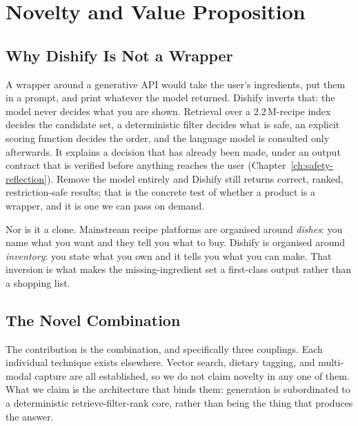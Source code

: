 \chapter{Novelty and Value Proposition}
\label{ch:novelty}

\section{Why Dishify Is Not a Wrapper}

A wrapper around a generative API would take the user's ingredients, put them
in a prompt, and print whatever the model returned. Dishify inverts that: the
model never decides what you are shown. Retrieval over a 2.2\,M-recipe index
decides the candidate set, a deterministic filter decides what is safe, an
explicit scoring function decides the order, and the language model is
consulted only afterwards. It explains a decision that has already been made,
under an output contract that is verified before anything reaches the user
(Chapter~\ref{ch:safety-reflection}). Remove the model entirely and Dishify
still returns correct, ranked, restriction-safe results; that is the concrete
test of whether a product is a wrapper, and it is one we can pass on demand.

Nor is it a clone. Mainstream recipe platforms are organised around
\emph{dishes}: you name what you want and they tell you what to buy. Dishify is
organised around \emph{inventory}: you state what you own and it tells you what
you can make. That inversion is what makes the missing-ingredient set a
first-class output rather than a shopping list.

\section{The Novel Combination}

The contribution is the combination, and specifically three couplings. Each
individual technique exists elsewhere. Vector search, dietary tagging, and
multi-modal capture are all established, so we do not claim novelty in any one
of them. What we claim is the architecture that binds them: generation is
subordinated to a deterministic retrieve-filter-rank core, rather than being
the thing that produces the answer.

